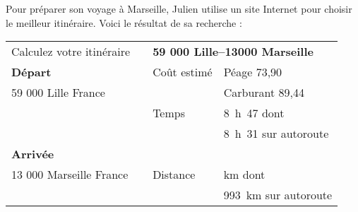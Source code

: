 \documentclass[10pt]{article}
\newcommand{\euro}{\eurologo{}}
\begin{document}
\setlength\parindent{0mm}
\pagestyle{fancy}
\thispagestyle{empty}
    
    
    




\medskip
 
Pour préparer son voyage à Marseille, Julien utilise un site Internet pour choisir le meilleur itinéraire. Voici le résultat de sa recherche : 

\begin{center}
\begin{tabularx}{\linewidth}{|l|m{1cm}|l X|}\hline
Calculez votre itinéraire	&	&\multicolumn{2}{|l|}{\textbf{59 000 Lille--13000 Marseille}}\\
\textbf{Départ}				&	&Coût estimé&Péage 73,90~\euro\\
59 000 Lille  France		&	&			&Carburant 89,44~\euro\\
							&	&Temps		&8~h~47 dont\\
							&	&			&8~h~31 sur autoroute\\
\textbf{Arrivée}			&	&			&\\
13 000 Marseille France		&	&Distance	&\np{1004} km dont\\
							&	&			&993~km sur autoroute\\ \hline
\end{tabularx}
\end{center}
\end{document}
